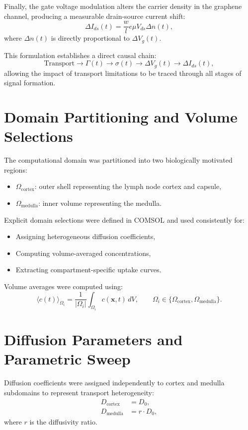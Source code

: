 \documentclass[12pt,a4paper]{report}
\begin{document}
Finally, the gate voltage modulation alters the carrier density in the graphene channel, producing a measurable drain-source current shift:
\begin{equation}
\Delta I_{ds}(t) = \frac{w}{l} e \mu V_{ds} \Delta n(t),
\end{equation}
where $\Delta n(t)$ is directly proportional to $\Delta V_g(t)$.

This formulation establishes a direct causal chain:
\[
\text{Transport} \rightarrow \Gamma(t) \rightarrow \sigma(t) \rightarrow \Delta V_g(t) \rightarrow \Delta I_{ds}(t),
\]
allowing the impact of transport limitations to be traced through all stages of signal formation.

\section{Domain Partitioning and Volume Selections}

The computational domain was partitioned into two biologically motivated regions:
\begin{itemize}
    \item $\Omega_{\text{cortex}}$: outer shell representing the lymph node cortex and capsule,
    \item $\Omega_{\text{medulla}}$: inner volume representing the medulla.
\end{itemize}

Explicit domain selections were defined in COMSOL and used consistently for:
\begin{itemize}
    \item Assigning heterogeneous diffusion coefficients,
    \item Computing volume-averaged concentrations,
    \item Extracting compartment-specific uptake curves.
\end{itemize}

Volume averages were computed using:
\begin{equation}
\langle c(t) \rangle_{\Omega_i}
=
\frac{1}{|\Omega_i|}
\int_{\Omega_i} c(\mathbf{x},t)\, dV,
\qquad
\Omega_i \in \{\Omega_{\text{cortex}}, \Omega_{\text{medulla}}\}.
\end{equation}

\section{Diffusion Parameters and Parametric Sweep}

Diffusion coefficients were assigned independently to cortex and medulla subdomains to represent transport heterogeneity:
\begin{align}
D_{\text{cortex}} &= D_0, \\
D_{\text{medulla}} &= r \cdot D_0,
\end{align}
where $r$ is the diffusivity ratio.
\end{document}

